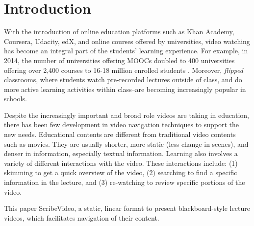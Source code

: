 \section{Introduction}
With the introduction of online education platforms such as Khan Academy, Coursera, Udacity, edX, and online courses offered by universities, video watching has become an integral part of the students' learning experience. For example, in 2014, the number of universities offering MOOCs doubled to 400 universities offering over 2,400 courses to 16-18 million enrolled students \cite{edsurge2014}. Moreover, \textit{flipped} classrooms, where students watch pre-recorded lectures outside of class, and do more active learning activities within class--are becoming increasingly popular in schools.  

Despite the increasingly important and broad role videos are taking in education, there has been few development in video navigation techniques to support the new needs. Educational contents are different from traditional video contents such as movies. They are usually shorter, more static (less change in scenes), and denser in information, especially textual information. Learning also involves a variety of different interactions with the video. These interactions include: (1) skimming to get a quick overview of the video, (2) searching to find a specific information in the lecture, and (3) re-watching to review specific portions of the video. 

This paper ScribeVideo, a static, linear format to present blackboard-style lecture videos, which facilitates navigation of their content.

